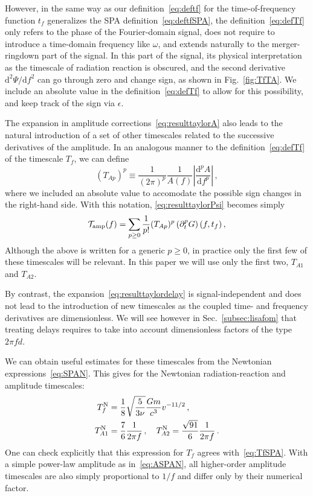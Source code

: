 \documentclass[aps,showpacs,twocolumn,
prd,superscriptaddress,nofootinbib]{revtex4-1}
\newcommand{\be}{\begin{equation}}
\newcommand{\ee}{\end{equation}}
\newcommand\ud{{\mathrm{d}}}
\newcommand\calT{{\mathcal{T}}}
\newcommand{\tf}{t_{f}}
\newcommand{\Tf}{T_{f}}
\begin{document}
However, in the same way as our definition~\eqref{eq:deftf} for the time-of-frequency function $t_{f}$ generalizes the SPA definition~\eqref{eq:deftfSPA}, the definition~\eqref{eq:defTf} only refers to the phase of the Fourier-domain signal, does not require to introduce a time-domain frequency like $\omega$, and extends naturally to the merger-ringdown part of the signal. In this part of the signal, its physical interpretation as the timescale of radiation reaction is obscured, and the second derivative $\ud^{2}\Psi/\ud f^{2}$ can go through zero and change sign, as shown in Fig.~\ref{fig:TfTA}. We include an absolute value in the definition~\eqref{eq:defTf} to allow for this possibility, and keep track of the sign via $\epsilon$.

The expansion in amplitude corrections~\eqref{eq:resulttaylorA} also leads to the natural introduction of a set of other timescales related to the successive derivatives of the amplitude. In an analogous manner to the definition~\eqref{eq:defTf} of the timescale $\Tf$, we can define
\be\label{eq:defTA}
	\left( T_{Ap} \right)^{p} \equiv \frac{1}{(2 \pi)^{p}} \frac{1}{A(f)} \left| \frac{\ud^{p} A}{\ud f^{p}} \right| \,,
\ee
where we included an absolute value to accomodate the possible sign changes in the right-hand side. With this notation, \eqref{eq:resulttaylorPsi} becomes simply
\be\label{eq:resulttaylorA}
	\calT_{\rm amp}(f) = \sum\limits_{p\geq 0} \frac{1}{p!} (T_{Ap})^{p}  \left( \partial_{t}^{p} G \right) (f,\tf) \,,
\ee
Although the above is written for a generic $p\geq 0$, in practice only the first few of these timescales will be relevant. In this paper we will use only the first two, $T_{A1}$ and $T_{A2}$.

By contrast, the expansion~\eqref{eq:resulttaylordelay} is signal-independent and does not lead to the introduction of new timescales as the coupled time- and frequency derivatives are dimensionless. We will see however in Sec.~\ref{subsec:lisafom} that treating delays requires to take into account dimensionless factors of the type $2\pi f d$.

We can obtain useful estimates for these timescales from the Newtonian expressions~\eqref{eq:SPAN}. This gives for the Newtonian radiation-reaction and amplitude timescales:
\begin{subequations}\label{eq:timescalesN}
\begin{align}
	\Tf^{\rm N} &= \frac{1}{8} \sqrt{\frac{5}{3\nu}} \frac{G m}{c^{3}} v^{-11/2} \,, \label{eq:TfN}\\
	T_{A1}^{\rm N} &= \frac{7}{6} \frac{1}{2\pi f}\,, \quad T_{A2}^{\rm N} = \frac{\sqrt{91}}{6} \frac{1}{2\pi f} \,. \label{eq:TA1N-TA2N}
\end{align}
\end{subequations}
One can check explicitly that this expression for $\Tf$ agrees with~\eqref{eq:TfSPA}. With a simple power-law amplitude as in~\eqref{eq:ASPAN}, all higher-order amplitude timescales are also simply proportional to $1/f$ and differ only by their numerical factor.
\end{document}
